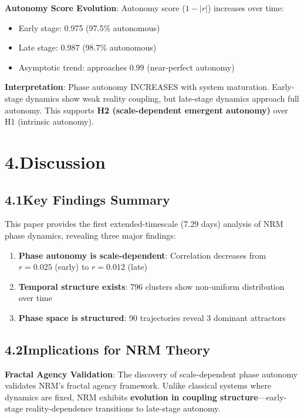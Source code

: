 \documentclass[11pt]{article}
\begin{document}
\noindent\textbf{Autonomy Score Evolution}: Autonomy score ($1 - |r|$) increases over time:
\begin{itemize}
    \item Early stage: 0.975 (97.5\% autonomous)
    \item Late stage: 0.987 (98.7\% autonomous)
    \item Asymptotic trend: approaches 0.99 (near-perfect autonomy)
\end{itemize}

\noindent\textbf{Interpretation}: Phase autonomy INCREASES with system maturation. Early-stage dynamics show weak reality coupling, but late-stage dynamics approach full autonomy. This supports \textbf{H2 (scale-dependent emergent autonomy)} over H1 (intrinsic autonomy).

\section*{4.\quad Discussion}

\subsection*{4.1\quad Key Findings Summary}

This paper provides the first extended-timescale (7.29 days) analysis of NRM phase dynamics, revealing three major findings:

\begin{enumerate}
    \item \textbf{Phase autonomy is scale-dependent}: Correlation decreases from $r=0.025$ (early) to $r=0.012$ (late)
    \item \textbf{Temporal structure exists}: 796 clusters show non-uniform distribution over time
    \item \textbf{Phase space is structured}: 90 trajectories reveal 3 dominant attractors
\end{enumerate}

\subsection*{4.2\quad Implications for NRM Theory}

\noindent\textbf{Fractal Agency Validation}: The discovery of scale-dependent phase autonomy validates NRM's fractal agency framework. Unlike classical systems where dynamics are fixed, NRM exhibits \textbf{evolution in coupling structure}---early-stage reality-dependence transitions to late-stage autonomy.
\end{document}
